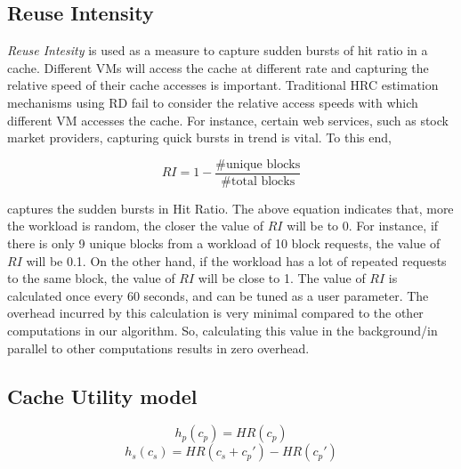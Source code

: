 
 \subsection{Reuse Intensity}

\emph{Reuse Intesity} is used as a measure to capture sudden bursts of hit ratio in a cache. Different VMs will access the cache at different rate and capturing the relative speed of their cache accesses is important. Traditional HRC estimation mechanisms using RD fail to consider the relative access speeds with which different VM accesses the cache. For instance, certain web services, such as stock market providers, capturing quick bursts in trend is vital. To this end,

\begin{equation}
RI = 1 - \frac{\text{\# unique blocks}}{\text{\# total blocks}}
\label{eq:ri}
\end{equation}

captures the sudden bursts in Hit Ratio. The above equation indicates that, more the workload is random, the closer the value of $RI$ will be to 0. For instance, if there is only 9 unique blocks from a workload of 10 block requests, the value of $RI$ will be 0.1. On the other hand, if the workload has a lot of repeated requests to the same block, the value of $RI$ will be close to 1. The value of $RI$ is calculated once every 60 seconds, and can be tuned as a user parameter. The overhead incurred by this calculation is very minimal compared to the other computations in our algorithm. So, calculating this value in the background/in parallel to other computations results in zero overhead. 

\subsection{Cache Utility model}


$$ h_p(c_p)  = HR(c_p) $$
$$ h_s(c_s)  = HR(c_s + c_p') - HR(c_p') $$

